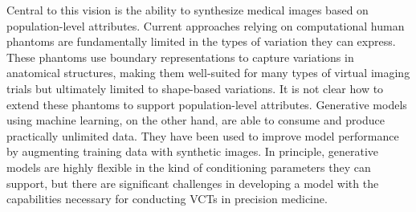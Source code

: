 Central to this vision is the ability to synthesize medical images based on population-level attributes.
Current approaches relying on computational human phantoms\cite{abadi2020virtual, badano2023stochastic} are fundamentally limited in the types of variation they can express. These phantoms use boundary representations to capture variations in anatomical structures, making them well-suited for many types of virtual imaging trials\cite{segars2008realistic} but ultimately limited to shape-based variations.
It is not clear how to extend these phantoms to support population-level attributes.
Generative models using machine learning, on the other hand, are able to consume and produce practically unlimited data.\cite{ibrahim2024generative}
They have been used to improve model performance by augmenting training data with synthetic images.\cite{khader2023denoising}
In principle, generative models are highly flexible in the kind of conditioning parameters they can support, but there are significant challenges in developing a model with the capabilities necessary for conducting VCTs in precision medicine.


